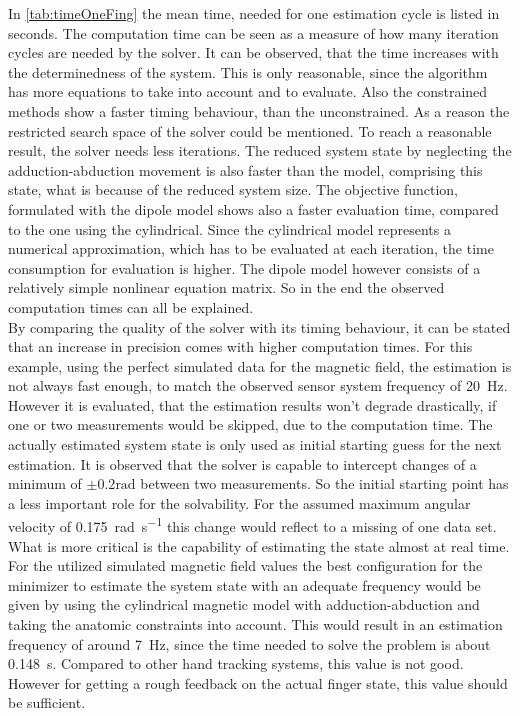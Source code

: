 In \ref{tab:timeOneFing} the mean time, needed for one estimation cycle is listed in seconds. The computation time can be seen as a measure of how many iteration cycles are needed by the solver. It can be observed, that the time increases with the determinedness of the system. This is only reasonable, since the algorithm has more equations to take into account and to evaluate. Also the constrained methods show a faster timing behaviour, than the unconstrained. As a reason the restricted search space of the solver could be mentioned. To reach a reasonable result, the solver needs less iterations. The reduced system state by neglecting the adduction-abduction movement is also faster than the model, comprising this state, what is because of the reduced system size. The objective function, formulated with the dipole model shows also a faster evaluation time, compared to the one using the cylindrical. Since the cylindrical model represents a numerical approximation, which has to be evaluated at each iteration, the time consumption for evaluation is higher. The dipole model however consists of a relatively simple nonlinear equation matrix. So in the end the observed computation times can all be explained.\\
By comparing the quality of the solver with its timing behaviour, it can be stated that an increase in precision comes with higher computation times. For this example, using the perfect simulated data for the magnetic field, the estimation is not always fast enough, to match the observed sensor system frequency of \SI{20}{\Hz}. However it is evaluated, that the estimation results won't degrade drastically, if one or two measurements would be skipped, due to the computation time. The actually estimated system state is only used as initial starting guess for the next estimation. It is observed that the solver is capable to intercept changes of a minimum of $ \pm 0.2 \si{\radian} $ between two measurements. So the initial starting point has a less important role for the solvability. For the assumed maximum angular velocity of \SI[per-mode=symbol]{0.175}{\radian \per \second} this change would reflect to a missing of one data set. What is more critical is the capability of estimating the state almost at real time. For the utilized simulated magnetic field values the best configuration for the minimizer to estimate the system state with an adequate frequency would be given by using the cylindrical magnetic model with adduction-abduction and taking the anatomic constraints into account. This would result in an estimation frequency of around \SI{7}{\Hz}, since the time needed to solve the problem is about \SI{0.148}{\second}. Compared to other hand tracking systems, this value is not good. However for getting a rough feedback on the actual finger state, this value should be sufficient.
